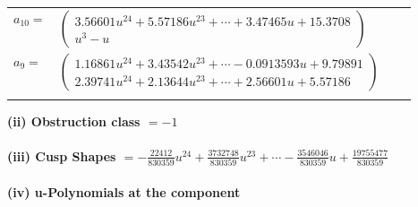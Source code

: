 \documentclass[1p]{elsarticle_modified}
\theoremstyle{definition}
\begin{document}
\begin{tabular}{m{7pt} m{180pt} m{7pt} m{180pt} }
\flushright $a_{10}=$&$\begin{pmatrix}3.56601 u^{24}+5.57186 u^{23}+\cdots+3.47465 u+15.3708\\u^3- u\end{pmatrix}$ \\
\flushright $a_{9}=$&$\begin{pmatrix}1.16861 u^{24}+3.43542 u^{23}+\cdots-0.0913593 u+9.79891\\2.39741 u^{24}+2.13644 u^{23}+\cdots+2.56601 u+5.57186\end{pmatrix}$\\&\end{tabular}
\flushleft \textbf{(ii) Obstruction class $= -1$}\\~\\
\flushleft \textbf{(iii) Cusp Shapes $= -\frac{22412}{830359} u^{24}+\frac{3732748}{830359} u^{23}+\cdots-\frac{3546046}{830359} u+\frac{19755477}{830359}$}\\~\\
\newpage\renewcommand{\arraystretch}{1}
\flushleft \textbf{(iv) u-Polynomials at the component}\newline \\
\end{document}
